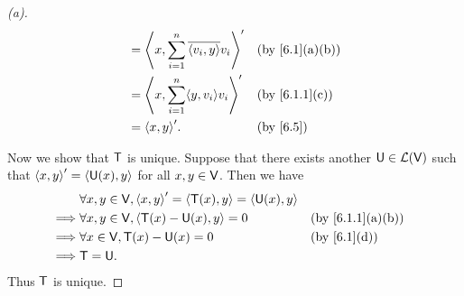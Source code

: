 \begin{proof}[(a)]
\begin{align*}
                                        & = \inn{x, \sum_{i = 1}^n \conj{\inn{v_i, y}} v_i}'                             &  & \text{(by \cref{6.1}(a)(b))}   \\
                                        & = \inn{x, \sum_{i = 1}^n \inn{y, v_i} v_i}'                                    &  & \text{(by \cref{6.1.1}(c))}    \\
                                        & = \inn{x, y}'.                                                                 &  & \text{(by \cref{6.5})}
  \end{align*}

  Now we show that \(\mathsf{T}\) is unique.
  Suppose that there exists another \(\mathsf{U} \in \mathcal{L}(\mathsf{V})\) such that \(\left\langle x, y\right\rangle' = \left\langle\mathsf{U}(x), y\right\rangle\) for all \(x, y \in \mathsf{V}\).
  Then we have
  \begin{align*}
             & \forall x, y \in \V, \inn{x, y}' = \inn{\T(x), y} = \inn{\U(x), y}                                     \\
    \implies & \forall x, y \in \V, \inn{\T(x) - \U(x), y} = 0                    &  & \text{(by \cref{6.1.1}(a)(b))} \\
    \implies & \forall x \in \V, \T(x) - \U(x) = 0                                &  & \text{(by \cref{6.1}(d))}      \\
    \implies & \T = \U.
  \end{align*}
  Thus \(\mathsf{T}\) is unique.
\end{proof}

